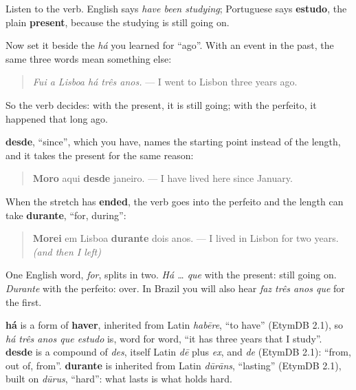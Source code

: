 Listen to the verb. English says \emph{have been studying}; Portuguese says \textbf{estudo}, the plain \textbf{present}, because the studying is still going on.

Now set it beside the \emph{há} you learned for \textquotedblleft{}ago\textquotedblright{}. With an event in the past, the same three words mean something else:

\begin{quote}
\emph{Fui a Lisboa há três anos.} — I went to Lisbon three years ago.
\end{quote}

So the verb decides: with the present, it is still going; with the perfeito, it happened that long ago.

\begin{grammarlens}[title={Grammar Lens: desde, and durante}]
\textbf{desde}, \textquotedblleft{}since\textquotedblright{}, which you have, names the starting point instead of the length, and it takes the present for the same reason:

\begin{quote}
\textbf{Moro} aqui \textbf{desde} janeiro. — I have lived here since January.
\end{quote}

When the stretch has \textbf{ended}, the verb goes into the perfeito and the length can take \textbf{durante}, \textquotedblleft{}for, during\textquotedblright{}:

\begin{quote}
\textbf{Morei} em Lisboa \textbf{durante} dois anos. — I lived in Lisbon for two years. \emph{(and then I left)}
\end{quote}

One English word, \emph{for}, splits in two. \emph{Há … que} with the present: still going on. \emph{Durante} with the perfeito: over. In Brazil you will also hear \emph{faz três anos que} for the first.
\end{grammarlens}

\begin{cousinweb}
\textbf{há} is a form of \textbf{haver}, inherited from Latin \emph{habēre}, \textquotedblleft{}to have\textquotedblright{} (EtymDB 2.1), so \emph{há três anos que estudo} is, word for word, \textquotedblleft{}it has three years that I study\textquotedblright{}. \textbf{desde} is a compound of \emph{des}, itself Latin \emph{dē} plus \emph{ex}, and \emph{de} (EtymDB 2.1): \textquotedblleft{}from, out of, from\textquotedblright{}. \textbf{durante} is inherited from Latin \emph{dūrāns}, \textquotedblleft{}lasting\textquotedblright{} (EtymDB 2.1), built on \emph{dūrus}, \textquotedblleft{}hard\textquotedblright{}: what lasts is what holds hard.
\end{cousinweb}

